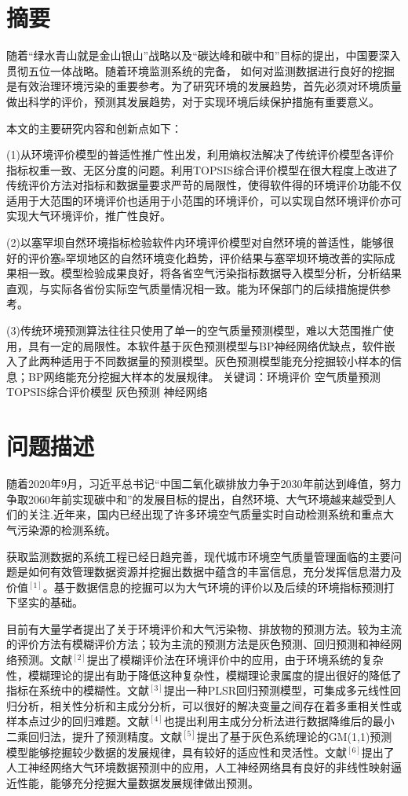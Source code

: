 \documentclass[UTF8]{ctexart}
\begin{document}
\newpage


\section{摘要}
随着“绿水青山就是金山银山”战略以及“碳达峰和碳中和”目标的提出，中国要深入贯彻五位一体战略。随着环境监测系统的完备，
如何对监测数据进行良好的挖掘是有效治理环境污染的重要参考。为了研究环境的发展趋势，首先必须对环境质量做出科学的评价，预测其发展趋势，对于实现环境后续保护措施有重要意义。

本文的主要研究内容和创新点如下：


(1)从环境评价模型的普适性推广性出发，利用熵权法解决了传统评价模型各评价指标权重一致、无区分度的问题。利用TOPSIS综合评价模型在很大程度上改进了传统评价方法对指标和数据量要求严苛的局限性，使得软件得的环境评价功能不仅适用于大范围的环境评价也适用于小范围的环境评价，可以实现自然环境评价亦可实现大气环境评价，推广性良好。

(2)以塞罕坝自然环境指标检验软件内环境评价模型对自然环境的普适性，能够很好的评价塞s罕坝地区的自然环境变化趋势，评价结果与塞罕坝环境改善的实际成果相一致。模型检验成果良好，将各省空气污染指标数据导入模型分析，分析结果直观，与实际各省份实际空气质量情况相一致。能为环保部门的后续措施提供参考。

(3)传统环境预测算法往往只使用了单一的空气质量预测模型，难以大范围推广使用，具有一定的局限性。本软件基于灰色预测模型与BP神经网络优缺点，软件嵌入了此两种适用于不同数据量的预测模型。灰色预测模型能充分挖掘较小样本的信息；BP网络能充分挖掘大样本的发展规律。
关键词：环境评价 空气质量预测 TOPSIS综合评价模型 灰色预测 神经网络

\newpage
\tableofcontents
\newpage
\section{问题描述}
随着2020年9月，习近平总书记“中国二氧化碳排放力争于2030年前达到峰值，努力争取2060年前实现碳中和”的发展目标的提出，自然环境、大气环境越来越受到人们的关注.近年来，国内已经出现了许多环境空气质量实时自动检测系统和重点大气污染源的检测系统。

获取监测数据的系统工程已经日趋完善，现代城市环境空气质量管理面临的主要问题是如何有效管理数据资源并挖掘出数据中蕴含的丰富信息，充分发挥信息潜力及价值$^{[1]}$。基于数据信息的挖掘可以为大气环境的评价以及后续的环境指标预测打下坚实的基础。

目前有大量学者提出了关于环境评价和大气污染物、排放物的预测方法。较为主流的评价方法有模糊评价方法；较为主流的预测方法是灰色预测、回归预测和神经网络预测。文献$^{[2]}$提出了模糊评价法在环境评价中的应用，由于环境系统的复杂性，模糊理论的提出有助于降低这种复杂性，模糊理论隶属度的提出很好的降低了指标在系统中的模糊性。文献$^{[3]}$提出一种PLSR回归预测模型，可集成多元线性回归分析，相关性分析和主成分分析，可以很好的解决变量之间存在着多重相关性或样本点过少的回归难题。文献$^{[4]}$也提出利用主成分分析法进行数据降维后的最小二乘回归法，提升了预测精度。文献$^{[5]}$提出了基于灰色系统理论的GM(1,1)预测模型能够挖掘较少数据的发展规律，具有较好的适应性和灵活性。文献$^{[6]}$提出了人工神经网络大气环境数据预测中的应用，人工神经网络具有良好的非线性映射逼近性能，能够充分挖掘大量数据发展规律做出预测。
\end{document}
